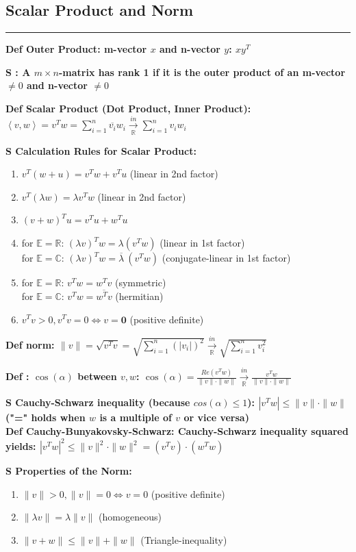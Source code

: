 \documentclass[7pt,landscape, margin = 0.1mm]{article}
\newcommand*{\mysubsection}[1]{\vspace{-2mm}\color{chaptercolor}\subsection{ #1 }
\vspace{-1mm}\hrule\vspace{1.5mm}\color{black}
\vspace{2mm}}
\newcommand{\DEF}[2]{\color{chaptercolor}\bf{Def #1}:\color{black}    \hspace{0.2cm} #2}
\newcommand{\SA}[2]{\color{chaptercolor}\bf{S #1}:\color{black}    \hspace{0.2cm} #2}
\begin{document}
\begin{multicols}{4}
\begin{flushleft}
{{\mysubsection{Scalar Product and Norm}
\DEF{Outer Product}{m-vector $x$ and n-vector $y$: $xy^T$}

\SA{}{A $m \times n $-matrix has rank 1 if it is the outer product of an m-vector $\neq 0 $ and n-vector $\neq 0 $}

\DEF{Scalar Product (Dot Product, Inner Product)}{ $\left<v,w\right> = v^Tw = \sum_{i=1}^{n} \overline{v_i} w_i \xrightarrow[ \mathbb{R}]{in}\sum_{i=1}^{n} v_i w_i$}

\SA{Calculation Rules for Scalar Product}{\begin{enumerate}[nolistsep]
  \item $v^T(w+u)=v^Tw+v^Tu$ (linear in 2nd factor)
  \item $v^T(\lambda w) = \lambda v^Tw$ (linear in 2nd factor)
  \item $(v+w)^Tu=v^Tu+w^Tu$ 
  \item for $ \mathbb{E} = \mathbb{R}$: $ (\lambda v)^Tw= \lambda (v^Tw)$ (linear in 1st factor)\\ for $ \mathbb{E} = \mathbb{C}$: $(\lambda v)^Tw = \overline{\lambda}\ (v^Tw)$ (conjugate-linear in 1st factor)
  \item for $ \mathbb{E} = \mathbb{R}$: $v^Tw=w^Tv$ (symmetric)\\ for $ \mathbb{E} = \mathbb{C}$: $v^Tw=\overline{w^Tv}$ (hermitian)
  \item $v^Tv > 0, v^Tv=0 \iff v=\bm{0}$ (positive definite)
\end{enumerate}
}

\DEF{norm}{$ \|v\| = \sqrt{v^Tv} = \sqrt{\sum_{i=1}^{n} (|v_i|)^2} \xrightarrow[\mathbb{R}]{in} \sqrt{\sum_{i=1}^{n} v_i^2}$}

\DEF{}{$\cos(\alpha)$ between $v,w$: $ \cos(\alpha) = \frac{Re (v^Tw)}{\|v\| \cdot \|w\|}\xrightarrow[\mathbb{R}]{in} \frac{v^Tw}{\|v\| \cdot \|w\|}$}

\SA{Cauchy-Schwarz inequality (because $cos(\alpha)\leq 1$)}{$|v^Tw| \leq \|v\| \cdot \|w\|$("=" holds when $w$ is a multiple of $v$ or vice versa)}\\

\DEF{Cauchy-Bunyakovsky-Schwarz}{Cauchy-Schwarz inequality squared yields: $|v^Tw|^2 \leq \|v\|^2 \cdot \|w\|^2 = (v^Tv) \cdot (w^Tw)$}

\SA{Properties of the Norm}{
\begin{enumerate}[nolistsep]
  \item $\|v\| > 0, \|v\| = 0 \iff v=0$ (positive definite)
  \item $\|\lambda v\| = \lambda \|v\| $ (homogeneous)
  \item $\|v + w\| \leq \|v\| + \|w\|$ (Triangle-inequality)
\end{enumerate}} 

}}
\end{flushleft}
\end{multicols}
\end{document}
